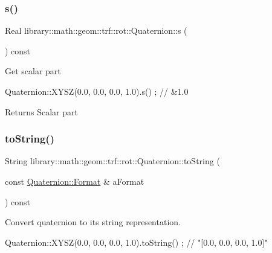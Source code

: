 \subsubsection{\texorpdfstring{s()}{s()}}
{\footnotesize\ttfamily Real library\+::math\+::geom\+::trf\+::rot\+::\+Quaternion\+::s (\begin{DoxyParamCaption}{ }\end{DoxyParamCaption}) const}

Get scalar part


\begin{DoxyCode}
Quaternion::XYSZ(0.0, 0.0, 0.0, 1.0).s() ; \textcolor{comment}{// &1.0}
\end{DoxyCode}


\begin{DoxyReturn}{Returns}
Scalar part 
\end{DoxyReturn}
\mbox{\label{classlibrary_1_1math_1_1geom_1_1trf_1_1rot_1_1_quaternion_adb8b06d466e8235dd5ff4ded9331a85f}} 
\subsubsection{\texorpdfstring{to\+String()}{toString()}\hspace{0.1cm}{\footnotesize\ttfamily [1/2]}}
{\footnotesize\ttfamily String library\+::math\+::geom\+::trf\+::rot\+::\+Quaternion\+::to\+String (\begin{DoxyParamCaption}\item[{const \hyperlink{classlibrary_1_1math_1_1geom_1_1trf_1_1rot_1_1_quaternion_a2ca851b117657819310fe5a9b9e5d681}{Quaternion\+::\+Format} \&}]{a\+Format }\end{DoxyParamCaption}) const}



Convert quaternion to its string representation. 


\begin{DoxyCode}
Quaternion::XYSZ(0.0, 0.0, 0.0, 1.0).toString() ; \textcolor{comment}{// "[0.0, 0.0, 0.0, 1.0]"}
\end{DoxyCode}



